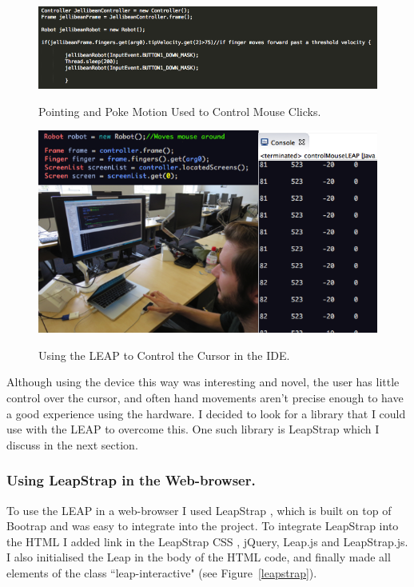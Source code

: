 \documentclass[a4paper, 11pt]{article}
\begin{document}
\begin{figure}[H]
\begin{center}
\includegraphics[scale=0.5]{leapCode}\\
\caption{Pointing and Poke Motion Used to Control Mouse Clicks.}
\label{leapCode}
\end{center}
\end{figure}

\begin{figure}[H]
\begin{center}
\includegraphics[scale=0.65]{Monty1}\\
\caption{Using the LEAP to Control the Cursor in the IDE.}
\label{Monty}
\end{center}
\end{figure}

Although using the device this way was interesting and novel, the user has little control over the cursor, and often hand movements aren't precise enough to have a good experience using the hardware. I decided to look for a library that I could use with the LEAP to overcome this. One such library is LeapStrap which I discuss in the next section.


\subsubsection{Using LeapStrap in the Web-browser.}
To use the LEAP in a web-browser I used LeapStrap \cite{leapstrap}, which is built on top of Bootrap and was easy to integrate into the project. To integrate LeapStrap into the HTML I added link in the LeapStrap CSS , jQuery, Leap.js and LeapStrap.js. I also initialised the Leap in the body of the HTML code, and finally made all elements of the class ``leap-interactive" (see Figure~\ref{leapstrap}). 
\end{document}
